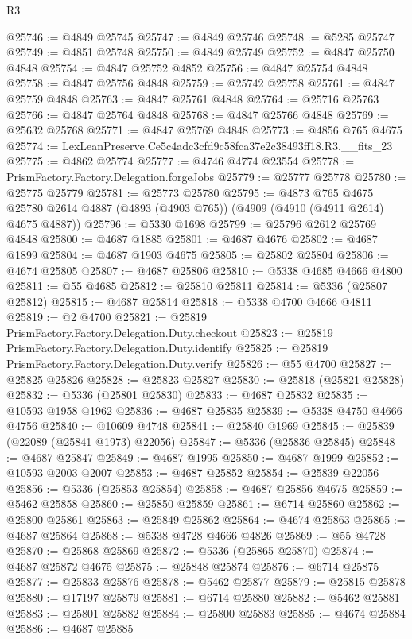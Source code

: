 \begin{lexlean}{R3}
\begin{coremodule}
@25746 := @4849 @25745
@25747 := @4849 @25746
@25748 := @5285 @25747
@25749 := @4851 @25748
@25750 := @4849 @25749
@25752 := @4847 @25750 @4848
@25754 := @4847 @25752 @4852
@25756 := @4847 @25754 @4848
@25758 := @4847 @25756 @4848
@25759 := @25742 @25758
@25761 := @4847 @25759 @4848
@25763 := @4847 @25761 @4848
@25764 := @25716 @25763
@25766 := @4847 @25764 @4848
@25768 := @4847 @25766 @4848
@25769 := @25632 @25768
@25771 := @4847 @25769 @4848
@25773 := @4856 @765 @4675
@25774 := LexLeanPreserve.Ce5c4adc3cfd9c58fca37e2c38493ff18.R3.__fits_23
@25775 := @4862 @25774
@25777 := @4746 @4774 @23554
@25778 := PrismFactory.Factory.Delegation.forgeJobs
@25779 := @25777 @25778
@25780 := @25775 @25779
@25781 := @25773 @25780
@25795 := @4873
    @765
    @4675
    @25780
    @2614
    @4887
    (@4893 (@4903 @765))
    (@4909 (@4910 (@4911 @2614) @4675 @4887))
@25796 := @5330 @1698
@25799 := @25796 @2612 @25769 @4848
@25800 := @4687 @1885
@25801 := @4687 @4676
@25802 := @4687 @1899
@25804 := @4687 @1903 @4675
@25805 := @25802 @25804
@25806 := @4674 @25805
@25807 := @4687 @25806
@25810 := @5338 @4685 @4666 @4800
@25811 := @55 @4685
@25812 := @25810 @25811
@25814 := @5336 (@25807 @25812)
@25815 := @4687 @25814
@25818 := @5338 @4700 @4666 @4811
@25819 := @2 @4700
@25821 := @25819 PrismFactory.Factory.Delegation.Duty.checkout
@25823 := @25819 PrismFactory.Factory.Delegation.Duty.identify
@25825 := @25819 PrismFactory.Factory.Delegation.Duty.verify
@25826 := @55 @4700
@25827 := @25825 @25826
@25828 := @25823 @25827
@25830 := @25818 (@25821 @25828)
@25832 := @5336 (@25801 @25830)
@25833 := @4687 @25832
@25835 := @10593 @1958 @1962
@25836 := @4687 @25835
@25839 := @5338 @4750 @4666 @4756
@25840 := @10609 @4748
@25841 := @25840 @1969
@25845 := @25839 (@22089 (@25841 @1973) @22056)
@25847 := @5336 (@25836 @25845)
@25848 := @4687 @25847
@25849 := @4687 @1995
@25850 := @4687 @1999
@25852 := @10593 @2003 @2007
@25853 := @4687 @25852
@25854 := @25839 @22056
@25856 := @5336 (@25853 @25854)
@25858 := @4687 @25856 @4675
@25859 := @5462 @25858
@25860 := @25850 @25859
@25861 := @6714 @25860
@25862 := @25800 @25861
@25863 := @25849 @25862
@25864 := @4674 @25863
@25865 := @4687 @25864
@25868 := @5338 @4728 @4666 @4826
@25869 := @55 @4728
@25870 := @25868 @25869
@25872 := @5336 (@25865 @25870)
@25874 := @4687 @25872 @4675
@25875 := @25848 @25874
@25876 := @6714 @25875
@25877 := @25833 @25876
@25878 := @5462 @25877
@25879 := @25815 @25878
@25880 := @17197 @25879
@25881 := @6714 @25880
@25882 := @5462 @25881
@25883 := @25801 @25882
@25884 := @25800 @25883
@25885 := @4674 @25884
@25886 := @4687 @25885

\end{coremodule}
\end{lexlean}
